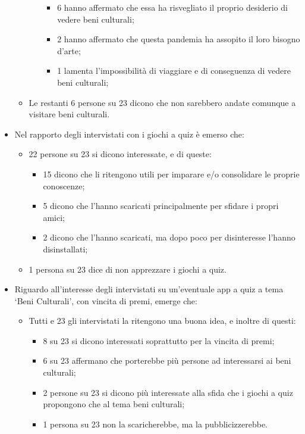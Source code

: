 \documentclass{article}
\begin{document}
\begin{itemize}
\begin{itemize}
\begin{itemize}
\begin{itemize}
		\item 6 hanno affermato che essa ha risvegliato il proprio desiderio di vedere beni culturali;
		\item 2 hanno affermato che questa pandemia ha assopito il loro bisogno d’arte;
		\item 1 lamenta l’impossibilità di viaggiare e di conseguenza di vedere beni culturali;
		\end{itemize}
	\end{itemize}
	\item Le restanti 6 persone su 23 dicono che non sarebbero andate comunque a visitare beni culturali.
	\end{itemize}
\item Nel rapporto degli intervistati con i giochi a quiz è emerso che:
	\begin{itemize}
	\item 22 persone su 23 si dicono interessate, e di queste:
		\begin{itemize}
		\item 15 dicono che li ritengono utili per imparare e/o consolidare le proprie conoscenze;
		\item 5 dicono che l’hanno scaricati principalmente per sfidare i propri amici;
		\item 2 dicono che l’hanno scaricati, ma dopo poco per disinteresse l’hanno disinstallati;
	\end{itemize}
	\item 1 persona su 23 dice di non apprezzare i giochi a quiz.
	\end{itemize}
\item Riguardo all’interesse degli intervistati su un’eventuale app a quiz a tema ‘Beni Culturali’, con vincita di premi, emerge che:
	\begin{itemize}
	\item Tutti e 23 gli intervistati la ritengono una buona idea, e inoltre di questi:
		\begin{itemize}
		\item 8 su 23 si dicono interessati soprattutto per la vincita di premi;
		\item 6 su 23 affermano che porterebbe più persone ad interessarsi ai beni culturali;
		\item 2 persone su 23 si dicono più interessate alla sfida che i giochi a quiz propongono che al tema beni culturali;
		\item 1 persona su 23 non la scaricherebbe, ma la pubblicizzerebbe.
		\end{itemize}

\end{itemize}
\end{itemize}
\end{document}
